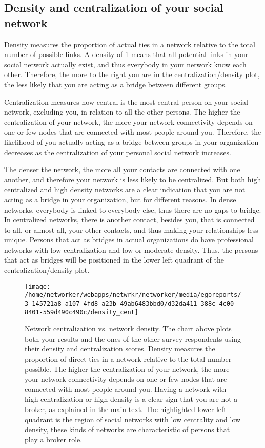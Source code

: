 \documentclass[a4paper,12pt]{article}
\begin{document}
\subsection*{Density and centralization of your social network}


Density measures the proportion of actual ties in a network relative to the total number of possible links. A density of 1 means that all potential links in your social network actually exist, and thus everybody in your network know each other. Therefore, the more to the right you are in the centralization/density plot, the less likely that you are acting as a bridge between different groups.

Centralization measures how central is the most central person on your social network, excluding you, in relation to all the other persons. The higher the centralization of your network, the more your network connectivity depends on one or few nodes that are connected with most people around you. Therefore, the likelihood of you actually acting as a bridge between groups in your organization decreases as the centralization of your personal social network increases.

The denser the network, the more all your contacts are connected with one another, and therefore your network is less likely to be centralized. But both high centralized and high density networks are a clear indication that you are not acting as a bridge in your organization, but for different reasons. In dense networks, everybody is linked to everybody else, thus there are no gaps to bridge. In centralized networks, there is another contact, besides you, that is connected to all, or almost all, your other contacts, and thus making your relationships less unique. Persons that act as bridges in actual organizations do have professional networks with low centralization and low or moderate density. Thus, the persons that act as bridges will be positioned in the lower left quadrant of the centralization/density plot.


\begin{figure}[H]
\centering
\texttt{[image: /home/networker/webapps/netwrkr/networker/media/egoreports/3\_145721a8-a107-4fd8-a23b-49ab6483bbd0/d32da411-388c-4c00-8401-559d490c490c/density\_cent]}
\caption{Network centralization vs. network density. The chart above plots both your results and the ones of the other survey respondents using their density and centralization scores. Density measures the proportion of direct ties in a network relative to the total number possible. The higher the centralization of your network, the more your network connectivity depends on one or few nodes that are connected with most people around you. Having a network with high centralization or high density is a clear sign that you are not a broker, as explained in the main text. The highlighted lower left quadrant is the region of social networks with low centrality and low density, these kinds of networks are characteristic of persons that play a broker role.}
\end{figure}
\end{document}
